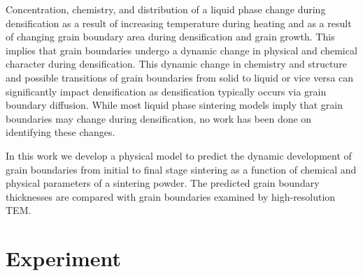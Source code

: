 Concentration, chemistry, and distribution of a liquid phase change during densification as a result of increasing temperature during heating and as a result of changing grain boundary area during densification and grain growth. This implies that grain boundaries undergo a dynamic change in physical and chemical character during densification. This dynamic change in chemistry and structure and possible transitions of grain boundaries from solid to liquid or vice versa can significantly impact densification as densification typically occurs via grain boundary diffusion. While most liquid phase sintering models imply that grain boundaries may change during densification, no work has been done on identifying these changes.

In this work we develop a physical model to predict the dynamic development of grain boundaries from initial to final stage sintering as a function of chemical and physical parameters of a sintering powder. The predicted grain boundary thicknesses are compared with grain boundaries examined by high-resolution TEM. 

\section{Experiment}

